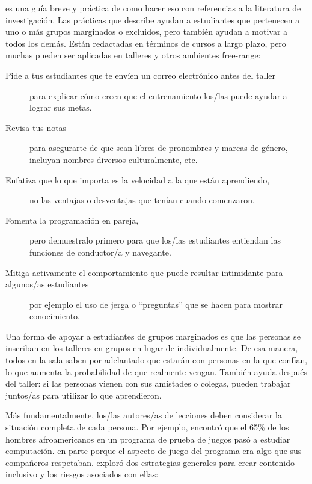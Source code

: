\cite{Lee2017} es una guía breve y práctica de como hacer eso con referencias a la literatura de investigación.
Las prácticas que describe ayudan a estudiantes que pertenecen a uno o más grupos marginados o excluidos,
pero también ayudan a motivar a todos los demás.
Están redactadas en términos de cursos a largo plazo,
pero muchas pueden ser aplicadas en talleres y otros ambientes free-range:

\begin{description}

\item[Pide a tus estudiantes que te envíen un correo electrónico antes del taller]
  para explicar cómo creen que el entrenamiento los/las puede ayudar a lograr sus metas.

\item[Revisa tus notas]
  para asegurarte de que sean libres de pronombres y marcas de género, incluyan nombres diversos culturalmente, etc.

\item[Enfatiza que lo que importa es la velocidad a la que están aprendiendo,]
  no las ventajas o desventajas que tenían cuando comenzaron.

\item[Fomenta la programación en pareja,]
  pero demuestralo primero para que los/las estudiantes entiendan las funciones de conductor/a y navegante.

\item[Mitiga activamente el comportamiento que puede resultar intimidante para algunos/as estudiantes]
  por ejemplo el uso de jerga o ``preguntas'' que se hacen para mostrar conocimiento.

\end{description}

Una forma de apoyar a estudiantes de grupos marginados es
que las personas se inscriban en los talleres en grupos en lugar de individualmente.
De esa manera,
todos en la sala saben por adelantado que estarán con personas en la que confían,
lo que aumenta la probabilidad de que realmente vengan.
También ayuda después del taller:
si las personas vienen con sus amistades o colegas,
pueden trabajar juntos/as para utilizar lo que aprendieron.

Más fundamentalmente,
los/las autores/as de lecciones deben considerar la situación completa de cada persona.
Por ejemplo,
\cite{DiSa2014a} encontró que el 65\% de los hombres afroamericanos en un programa de prueba de juegos pasó a estudiar computación.
en parte porque el aspecto de juego del programa era algo que sus compañeros respetaban.
\cite{Lach2018} exploró dos estrategias generales para crear contenido inclusivo y los riesgos asociados con ellas:

